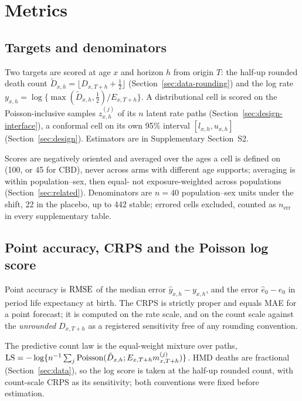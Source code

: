 \section{Metrics}
\label{sec:metrics}

\subsection{Targets and denominators}
\label{sec:metrics-target}

Two targets are scored at age $x$ and horizon $h$ from origin $T$: the half-up
rounded death count $\tilde D_{x,h}=\lfloor D_{x,T+h}+\tfrac12\rfloor$
(Section~\ref{sec:data-rounding}) and the log rate
$y_{x,h}=\log\{\max(\tilde D_{x,h},\tfrac12)/E_{x,T+h}\}$. A distributional
cell is scored on the Poisson-inclusive samples $z^{(j)}_{x,h}$ of its $n$
latent rate paths (Section~\ref{sec:design-interface}), a conformal cell on
its own 95\% interval $[l_{x,h},u_{x,h}]$ (Section~\ref{sec:design}).
Estimators are in Supplementary Section~S2.

Scores are negatively oriented and averaged over the ages a cell is defined on
(100, or 45 for CBD), never across arms with different age supports; averaging
is within population--sex, then equal- not exposure-weighted across
populations (Section~\ref{sec:related}). Denominators are $n=40$
population--sex units under the shift, 22 in the placebo, up to 442 stable;
errored cells excluded, counted as $n_{\mathrm{err}}$ in every supplementary
table.

\subsection{Point accuracy, CRPS and the Poisson log score}
\label{sec:metrics-logscore}

Point accuracy is $\operatorname{RMSE}$ of the median error $\hat y_{x,h}-y_{x,h}$, and the
error $\hat e_0-e_0$ in period life expectancy at birth. The CRPS
\citep{gneiting2007strictly} is strictly proper and equals MAE for a point
forecast; it is computed on the rate scale, and on the count scale against the
\emph{unrounded} $D_{x,T+h}$ as a registered sensitivity free of any rounding
convention.

The predictive count law is the equal-weight mixture over paths,
$\operatorname{LS}=-\log\{n^{-1}\sum_j\mathrm{Poisson}(\tilde
D_{x,h};E_{x,T+h}m^{(j)}_{x,T+h})\}$. HMD deaths are fractional
(Section~\ref{sec:data}), so the log score is taken at the half-up rounded
count, with count-scale CRPS as its sensitivity; both conventions were fixed
before estimation.


